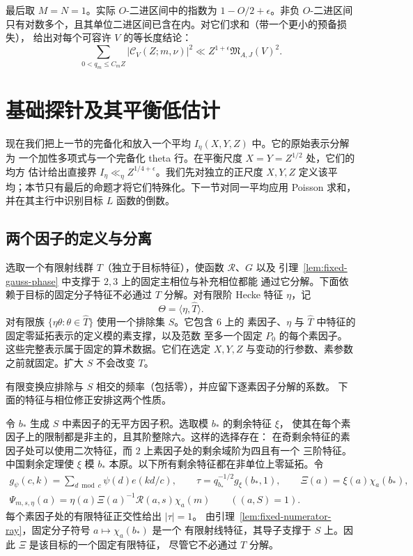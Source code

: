 最后取 $M=N=1$。实际 $O$-二进区间中的指数为 $1-O/2+\epsilon$。非负 $O$-二进区间
只有对数多个，且其单位二进区间已含在内。对它们求和（带一个更小的预备损失），
给出对每个可容许 $V$ 的等长度结论：
\begin{equation}\label{eq:unmarked-balanced-completed-moment}
 \sum_{0<q_m\le C_mZ}|\mathcal C_V(Z;m,\nu)|^2
 \ll Z^{1+\epsilon}\mathfrak M_{A,J}(V)^2.
\end{equation}

\section{基础探针及其平衡低估计}\label{sec:probe}

现在我们把上一节的完备化和放入一个平均 $I_\eta(X,Y,Z)$ 中。它的原始表示分解为
一个加性多项式与一个完备化 theta 行。在平衡尺度 $X=Y=Z^{1/2}$ 处，它们的均方
估计给出直接界 $I_\eta\ll_\eta Z^{1/4+\epsilon}$。我们先对独立的正尺度 $X,Y,Z$
定义该平均；本节只有最后的命题才将它们特殊化。下一节对同一平均应用 Poisson 求和，
并在其主行中识别目标 $L$ 函数的倒数。

\subsection{两个因子的定义与分离}

选取一个有限射线群 $T$（独立于目标特征），使函数 $\mathcal R$、$G$ 以及
引理~\ref{lem:fixed-gauss-phase} 中支撑于 $2,3$ 上的固定主相位与补充相位都能
通过它分解。下面依赖于目标的固定分子特征不必通过 $T$ 分解。对有限阶 Hecke
特征 $\eta$，记
\[
 \Theta=\langle\eta,\widehat T\rangle.
\]
对有限族 $\{\eta\theta:\theta\in\widehat T\}$ 使用一个排除集 $S$。它包含 $6$ 上的
素因子、$\eta$ 与 $\widehat T$ 中特征的固定零延拓表示的定义模的素支撑，以及范数
至多一个固定 $P_0$ 的每个素因子。这些完整表示属于固定的算术数据。它们在选定
$X,Y,Z$ 与变动的行参数、素参数之前就固定。扩大 $S$ 不会改变 $T$。

有限变换应排除与 $S$ 相交的频率（包括零），并应留下逐素因子分解的系数。
下面的特征与相位修正安排这两个性质。

令 $b_*$ 生成 $S$ 中素因子的无平方因子积。选取模 $b_*$ 的剩余特征 $\xi$，
使其在每个素因子上的限制都是非主的，且其阶整除六。这样的选择存在：
在奇剩余特征的素因子处可以使用二次特征，而 $2$ 上素因子处的剩余域阶为四且有一个
三阶特征。中国剩余定理使 $\xi$ 模 $b_*$ 本原。以下所有剩余特征都在非单位上零延拓。令
\[
 \begin{gathered}
 g_\psi(c,k)=\sum_{d\bmod c}\psi(d)e(kd/c),\qquad
 \tau=q_{b_*}^{-1/2}g_\xi(b_*,1),\qquad
 \Xi(a)=\xi(a)\chi_a(b_*),\\
 \Psi_{m,s,\eta}(a)=
       \eta(a)\Xi(a)^{-1}\mathcal R(a,s)\chi_a(m)
       \qquad ((a,S)=1).
 \end{gathered}
\]
每个素因子处的有限特征正交性给出 $|\tau|=1$。
由引理~\ref{lem:fixed-numerator-ray}，固定分子符号 $a\mapsto\chi_a(b_*)$ 是一个
有限射线特征，其导子支撑于 $S$ 上。因此 $\Xi$ 是该目标的一个固定有限特征，
尽管它不必通过 $T$ 分解。

